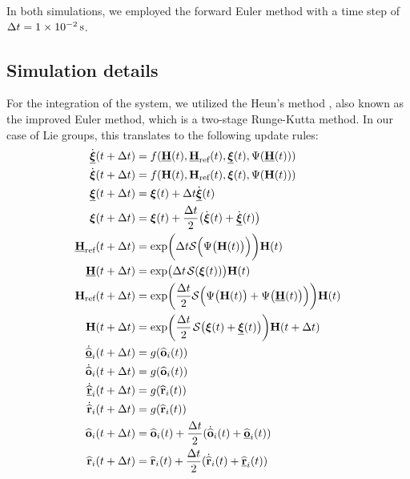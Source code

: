 In both simulations, we employed the forward Euler method with a time step of $\Delta t = \qty{1E-2}{\second}$. 
\subsection{Simulation details}
For the integration of the system, we utilized the Heun's method \citep[p. 330]{fred}, also known as the improved Euler method, which is a two-stage Runge-Kutta method. In our case of Lie groups, this translates to the following update rules:
\begin{align}
    \begin{split}
        \dot{\underline{\boldsymbol{\xi}}}(t+\Delta t) &= f(\underline{\mathbf{H}}(t), \underline{\mathbf{H}}_\text{ref}(t), \underline{\boldsymbol{\xi}}(t), \Psi(\underline{\mathbf{H}}(t)))\\
        \dot{\boldsymbol{\xi}}(t+\Delta t) &= f(\mathbf{H}(t), \mathbf{H}_\text{ref}(t), \boldsymbol{\xi}(t), \Psi(\mathbf{H}(t)))\\
        \underline{\boldsymbol{\xi}}(t + \Delta t) &= \boldsymbol{\xi}(t) + \Delta t \dot{\underline{\boldsymbol{\xi}}}(t)\\
        \boldsymbol{\xi}(t + \Delta t) &= \boldsymbol{\xi}(t) + \frac{\Delta t}{2} \bigl(\dot{\boldsymbol{\xi}}(t) + \dot{\underline{\boldsymbol{\xi}}}(t)\bigr)\\
        \underline{\mathbf{H}}_\text{ref}(t +\Delta t) &= \exp\biggl(\Delta t\mathcal{S}\Bigl(\Psi\bigl(\mathbf{H}(t)\bigr)\Bigr)\biggr)\mathbf{H}(t)\\
        \underline{\mathbf{H}}(t +\Delta t) &= \exp\bigl(\Delta t\SL[\boldsymbol{\xi}(t)]\bigr)\mathbf{H}(t)\\
        \mathbf{H}_\text{ref}(t + \Delta t) &= \exp\biggl(\frac{\Delta t}{2}\mathcal{S}\Bigl(\Psi\bigl(\mathbf{H}(t)\bigr) + \Psi\bigl(\underline{\mathbf{H}}(t)\bigr)\Bigr)\biggr)\mathbf{H}(t)\\
        \mathbf{H}(t + \Delta t) &= \exp\biggl(\frac{\Delta t}{2}\SL[\boldsymbol{\xi}(t) + \underline{\boldsymbol{\xi}}(t)]\biggr)\mathbf{H}(t + \Delta t)\\
        \underline{\dot{\widehat{\mathbf{o}}}}_i(t + \Delta t) &= g(\widehat{\mathbf{o}}_i(t))\\
        \dot{\widehat{\mathbf{o}}}_i(t + \Delta t) &= g(\widehat{\mathbf{o}}_i(t))\\
        \underline{\dot{\widehat{\mathbf{r}}}}_i(t + \Delta t) &= g(\widehat{\mathbf{r}}_i(t))\\
        \dot{\widehat{\mathbf{r}}}_i(t + \Delta t) &= g(\widehat{\mathbf{r}}_i(t))\\
        \widehat{\mathbf{o}}_i(t + \Delta t) &= \widehat{\mathbf{o}}_i(t) + \frac{\Delta t}{2} (\dot{\widehat{\mathbf{o}}}_i(t) + \underline{\widehat{\mathbf{o}}}_i(t))\\
        \widehat{\mathbf{r}}_i(t + \Delta t) &= \widehat{\mathbf{r}}_i(t) + \frac{\Delta t}{2} (\dot{\widehat{\mathbf{r}}}_i(t) + \underline{\widehat{\mathbf{r}}}_i(t))
    \end{split}
\end{align}


